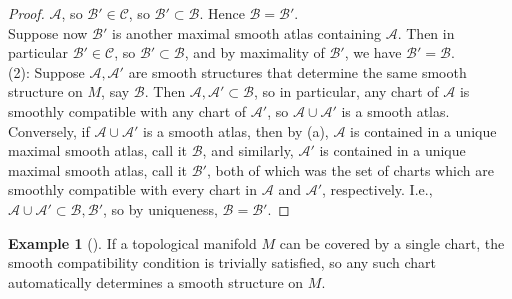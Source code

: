 \documentclass[reqno]{amsart}
\theoremstyle{plain}%
\theoremstyle{definition}
\newtheorem{example}[theorem]{Example}
\theoremstyle{remark}
\begin{document}
\begin{proof}
            $\mathcal{A}$, so $\mathcal{B}' \in \mathcal{C}$, so
            $\mathcal{B'} \subset \mathcal{B}$. Hence
            $\mathcal{B} = \mathcal{B'}$.\\
            Suppose now $\mathcal{B}'$ is another maximal smooth atlas containing
            $\mathcal{A}$. Then in particular $\mathcal{B}'
            \in \mathcal{C}$, so $\mathcal{B}' \subset \mathcal{B}$, and by
            maximality of $\mathcal{B}'$, we have $\mathcal{B}' = \mathcal{B}$.\\
            \linebreak
            (2): Suppose $\mathcal{A}, \mathcal{A}'$ are smooth structures that
            determine the same smooth structure on $M$, say $\mathcal{B}$. Then
            $\mathcal{A}, \mathcal{A}' \subset \mathcal{B}$, so
            in particular, any chart of $\mathcal{A}$ is smoothly compatible with any
            chart of $\mathcal{A}'$, so 
            $\mathcal{A} \cup \mathcal{A}'$ is a smooth atlas.\\
            Conversely, if $\mathcal{A}\cup \mathcal{A}'$ is a smooth atlas, then
            by (a), $\mathcal{A}$ is contained in a unique maximal smooth atlas, call
            it $\mathcal{B}$, and similarly, $\mathcal{A}'$ is contained in a unique
            maximal smooth atlas, call it $\mathcal{B}'$, both of which was the set of
            charts which are smoothly compatible with every chart in
            $\mathcal{A}$ and $\mathcal{A}'$, respectively. I.e., 
            $\mathcal{A} \cup \mathcal{A}' \subset \mathcal{B},\mathcal{B}'$, so
            by uniqueness, $\mathcal{B} = \mathcal{B}'$.
            \end{proof}


            \begin{example}[]
            If a topological manifold $M$ can be covered by a single chart, the smooth
            compatibility condition is trivially satisfied, so any such chart
            automatically determines a smooth structure on $M$.\\
            \end{example}
\end{document}
